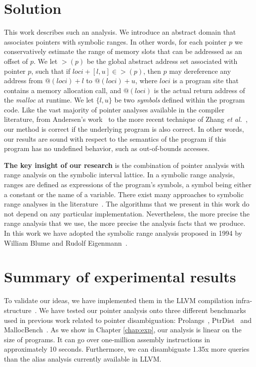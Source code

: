 \documentclass[12pt]{article}
\begin{document}
\section {Solution}
This work describes such an analysis.
We introduce an abstract domain that associates pointers with symbolic ranges.
In other words, for each pointer $p$ we conservatively estimate the range of
memory slots that can be addressed as an offset of $p$.
We let $>(p)$ be the global abstract address set associated with pointer $p$, 
such that if
$loc{i} + [l, u] \in >(p)$, then $p$ may dereference any address
from $@(loc{i}) + l$ to $@(loc{i}) + u$,
where $loc{i}$ is a program site that
contains a memory allocation call, and $@(loc{i})$ is the actual return
address of the {\em malloc} at runtime.
We let $\{ l, u \}$ be two {\em symbols} defined within the program code.
Like the vast majority of pointer analyses available in the compiler
literature, from Andersen's work~\cite{Andersen94} to the more recent 
technique of Zhang {\em et al.}~\cite{Zhang14}, our method is correct if the
underlying program is also correct.
In other words, our results are sound with respect to the semantics of the
program if this program has no undefined behavior, such as out-of-bounds
accesses.

\textbf{The key insight of our research} is the combination of pointer analysis
with range analysis on the symbolic interval lattice.
In a symbolic range analysis, ranges are defined as expressions of the program's
symbols, a symbol being either a constant or the name of a variable.
There exist many approaches to symbolic range analyses in the
literature~\cite{Blume94,Nazare14,Rugina05}.
The algorithms that we present in this work do not depend on any particular
implementation.
Nevertheless, the more precise the range analysis that we use, the more
precise the analysis facts that we produce.
In this work we have adopted the symbolic range analysis proposed in 1994 by
William Blume and Rudolf Eigenmann~\cite{Blume94}.

\section {Summary of experimental results}
To validate our ideas, we have implemented them in the LLVM compilation
infra-structure~\cite{Lattner04}.
We have tested our pointer analysis onto three different benchmarks
used in previous work related to pointer disambiguation:
Prolangs~\cite{Ryder01}, PtrDist~\cite{Zhao05} and MallocBench~\cite{Grunwald93}.
As we show in Chapter \ref{chap:exp}, our analysis is linear on the size of
programs.
It can go over one-million assembly instructions in approximately 10 seconds.
Furthermore, we can disambiguate 1.35x more queries than the alias analysis
currently available in LLVM.
\end{document}
